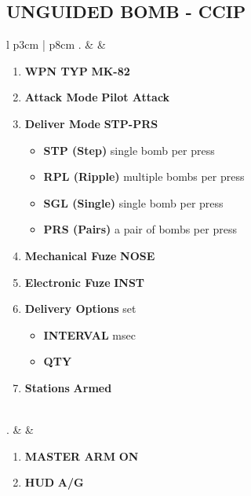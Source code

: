 \documentclass[8pt,usenames,dvipsnames,twoside]{article}
\begin{document}
		\subsection{UNGUIDED BOMB - CCIP}
		\begin{center}
			\begin{tabular}{l p{3cm} | p{8cm}}
				. &  & 
				\begin{minipage}[t]{\linewidth}
					\vspace{-7pt}
					\begin{enumerate}[label=(\alph*)]
						\item \textbf{WPN TYP} \dotfill \textbf{MK-82}
						\item \textbf{Attack Mode} \dotfill \textbf{Pilot Attack}
						\item \textbf{Deliver Mode} \dotfill \textbf{STP-PRS}
						\begin{itemize}
							\item \textbf{STP (Step)} single bomb per press
							\item \textbf{RPL (Ripple)} multiple bombs per press
							\item \textbf{SGL (Single)} single bomb per press
							\item \textbf{PRS (Pairs)} a pair of bombs per press
						\end{itemize}
						\item \textbf{Mechanical Fuze} \dotfill \textbf{NOSE}
						\item \textbf{Electronic Fuze} \dotfill \textbf{INST}
						\item \textbf{Delivery Options} \dotfill set 
						\begin{itemize}
							\item \textbf{INTERVAL}  msec
							\item \textbf{QTY} 
						\end{itemize}
						\item \textbf{Stations} \dotfill \textbf{Armed}
					\end{enumerate}
				\end{minipage} \\
				. &  & 
				\begin{minipage}[t]{\linewidth}
					\vspace{-7pt}
					\begin{enumerate}[label=(\alph*)]
						\item \textbf{MASTER ARM} \dotfill \textbf{ON}
						\item \textbf{HUD} \dotfill \textbf{A/G}

\end{enumerate}
\end{minipage}
\end{tabular}
\end{center}
\end{document}

